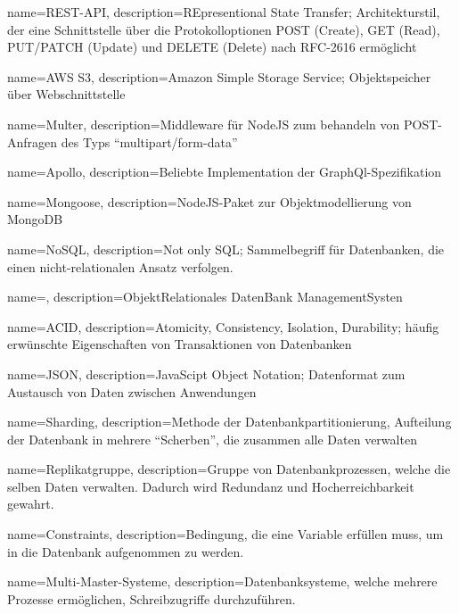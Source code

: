 {
    name=REST-API,
    description={REpresentional State Transfer; Architekturstil, der eine Schnittstelle über die Protokolloptionen POST (Create), GET (Read),  PUT/PATCH (Update) und DELETE (Delete) nach RFC-2616 ermöglicht}
}

{
    name=AWS S3,
    description={Amazon Simple Storage Service; Objektspeicher über Webschnittstelle}
}

{
    name=Multer,
    description={Middleware für NodeJS zum behandeln von POST-Anfragen des Typs \enquote{multipart/form-data}}
}

{
    name=Apollo,
    description={Beliebte Implementation der GraphQl-Spezifikation}
}

{
    name=Mongoose,
    description={NodeJS-Paket zur Objektmodellierung von MongoDB}
}

{
    name=NoSQL,
    description={Not only SQL; Sammelbegriff für Datenbanken, die einen nicht-relationalen Ansatz verfolgen.}
}

{
    name=,
    description={ObjektRelationales DatenBank ManagementSysten}
}

{
    name=ACID,
    description={Atomicity, Consistency, Isolation, Durability; häufig erwünschte Eigenschaften von Transaktionen von Datenbanken}
}

{
    name=JSON,
    description={JavaScipt Object Notation; Datenformat zum Austausch von Daten zwischen Anwendungen}
}

{
    name=Sharding,
    description={Methode der Datenbankpartitionierung, Aufteilung der Datenbank in mehrere \enquote{Scherben}, die zusammen alle Daten verwalten}
}

{
    name=Replikatgruppe,
    description={Gruppe von Datenbankprozessen, welche die selben Daten verwalten. Dadurch wird Redundanz und Hocherreichbarkeit gewahrt.}
}

{
    name=Constraints,
    description={Bedingung, die eine Variable erfüllen muss, um in die Datenbank aufgenommen zu werden.}
}

{
    name=Multi-Master-Systeme,
    description={Datenbanksysteme, welche mehrere Prozesse ermöglichen, Schreibzugriffe durchzuführen.}
}

